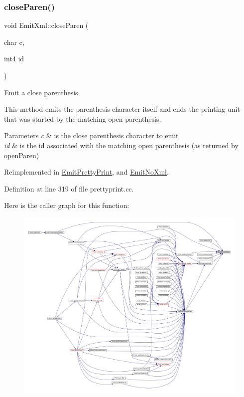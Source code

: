 \subsubsection{\texorpdfstring{closeParen()}{closeParen()}}
{\footnotesize\ttfamily void Emit\+Xml\+::close\+Paren (\begin{DoxyParamCaption}\item[{char}]{c,  }\item[{int4}]{id }\end{DoxyParamCaption})\hspace{0.3cm}{\ttfamily [virtual]}}



Emit a close parenthesis. 

This method emits the parenthesis character itself and ends the printing unit that was started by the matching open parenthesis. 
\begin{DoxyParams}{Parameters}
{\em c} & is the close parenthesis character to emit \\
\hline
{\em id} & is the id associated with the matching open parenthesis (as returned by open\+Paren) \\
\hline
\end{DoxyParams}


Reimplemented in \mbox{\hyperlink{class_emit_pretty_print_a83c6f5a16300b7b45526faf1f3c5c7de}{Emit\+Pretty\+Print}}, and \mbox{\hyperlink{class_emit_no_xml_a7554f4a6b9b246c34a3c4febd99c740c}{Emit\+No\+Xml}}.



Definition at line 319 of file prettyprint.\+cc.

Here is the caller graph for this function\+:
\nopagebreak
\begin{figure}[H]
\begin{center}
\leavevmode
\includegraphics[width=350pt]{class_emit_xml_a3442a3f23a65cfcf073d57cf64733493_icgraph}
\end{center}
\end{figure}
\mbox{\label{class_emit_xml_ad73a5d828fc7cd70f1e9ec1e6afad1fa}} 

